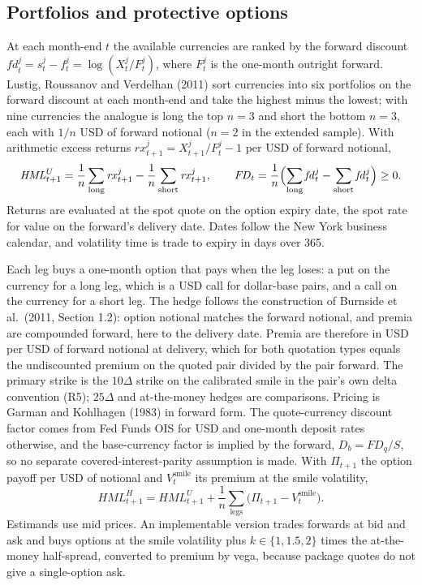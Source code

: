 \documentclass[11pt]{article}
\theoremstyle{result}
\newcommand{\HML}{\mathit{HML}}
\newcommand{\FD}{\mathit{FD}}
\newcommand{\fd}{\mathit{fd}}
\newcommand{\rx}{\mathit{rx}}
\newcommand{\Vsmile}{V^{\mathrm{smile}}}
\newcommand{\D}{\Delta}
\begin{document}
\subsection{Portfolios and protective options}

At each month-end $t$ the available currencies are ranked by the forward discount $\fd^j_t=s^j_t-f^j_t=\log(X^j_t/F^j_t)$, where $F^j_t$ is the one-month outright forward. Lustig, Roussanov and Verdelhan (2011) sort currencies into six portfolios on the forward discount at each month-end and take the highest minus the lowest; with nine currencies the analogue is long the top $n=3$ and short the bottom $n=3$, each with $1/n$ USD of forward notional ($n=2$ in the extended sample). With arithmetic excess returns $\rx^j_{t+1}=X^j_{t+1}/F^j_t-1$ per USD of forward notional,
\begin{equation}\label{eq:hml}
\HML^U_{t+1}=\frac1n\sum_{\text{long}}\rx^j_{t+1}-\frac1n\sum_{\text{short}}\rx^j_{t+1},\qquad
\FD_t=\frac1n\Bigl(\sum_{\text{long}}\fd^j_t-\sum_{\text{short}}\fd^j_t\Bigr)\ge0.
\end{equation}
Returns are evaluated at the spot quote on the option expiry date, the spot rate for value on the forward's delivery date. Dates follow the New York business calendar, and volatility time is trade to expiry in days over 365.

Each leg buys a one-month option that pays when the leg loses: a put on the currency for a long leg, which is a USD call for dollar-base pairs, and a call on the currency for a short leg. The hedge follows the construction of Burnside et al.\ (2011, Section 1.2): option notional matches the forward notional, and premia are compounded forward, here to the delivery date. Premia are therefore in USD per USD of forward notional at delivery, which for both quotation types equals the undiscounted premium on the quoted pair divided by the pair forward. The primary strike is the $10\D$ strike on the calibrated smile in the pair's own delta convention (R5); $25\D$ and at-the-money hedges are comparisons. Pricing is Garman and Kohlhagen (1983) in forward form. The quote-currency discount factor comes from Fed Funds OIS for USD and one-month deposit rates otherwise, and the base-currency factor is implied by the forward, $D_b=FD_q/S$, so no separate covered-interest-parity assumption is made. With $\Pi_{t+1}$ the option payoff per USD of notional and $\Vsmile_t$ its premium at the smile volatility,
\begin{equation}\label{eq:hmlh}
\HML^H_{t+1}=\HML^U_{t+1}+\frac1n\sum_{\text{legs}}\bigl(\Pi_{t+1}-\Vsmile_t\bigr).
\end{equation}
Estimands use mid prices. An implementable version trades forwards at bid and ask and buys options at the smile volatility plus $k\in\{1,1.5,2\}$ times the at-the-money half-spread, converted to premium by vega, because package quotes do not give a single-option ask.
\end{document}

